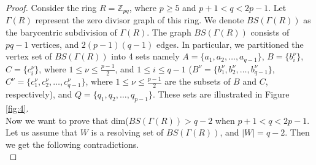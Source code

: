 \documentclass[10pt,a4paper]{amsart}
\begin{document}
    \begin{proof}
\noindent Consider the ring $R = \mathbb{Z}_{pq}$, where $p \geq 5$ and $p + 1 < q < 2p - 1$. Let $\Gamma(R)$ represent the zero divisor graph of this ring. We denote $BS(\Gamma(R))$ as the barycentric subdivision of $\Gamma(R)$. The graph $BS(\Gamma(R))$ consists of $pq-1$ vertices, and $2(p-1)(q-1)$ edges. In particular, we partitioned the vertex set of $BS(\Gamma(R))$ into 4 sets namely $A=\{a_1,a_2,\ldots, a_{q-1}\}$,  $B=\{b^\nu_i\}$, $C=\{c^\nu_i\}$, where $1\leq \nu\leq \frac{p-1}{2}$, and $1\leq i\leq {q-1}$ ($B^\nu=\{b^\nu_1,b^\nu_2,\ldots,b^\nu_{q-1}\}$, $C^\nu=\{c^\nu_1,c^\nu_2,\ldots,c^\nu_{q-1}\}$, where $1\leq \nu \leq \frac{p-1}{2}$ are the subsets of $B$ and $C$, respectively), and $Q=\{q_1,q_2, \ldots, q_{p-1}\}$. These sets are illustrated in Figure \ref{fig:4}. \\

\noindent Now we want to prove that dim($BS(\Gamma(R)) > q-2$ when $p+1< q<2p-1$. Let us assume that $W$ is a resolving set of $BS(\Gamma(R))$, and $|W|=q-2$. Then we get the following contradictions. \\



\end{proof}
\end{document}
